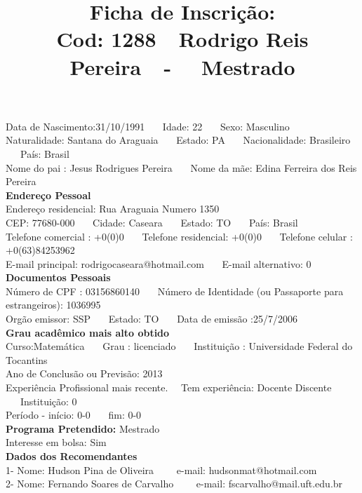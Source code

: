 \documentclass[11pt]{article}
\title{\vspace*{-4cm} Ficha de Inscrição: \\Cod: 1288\ \ Rodrigo Reis Pereira\ \ - \ \ Mestrado 
 }
\date{}
\begin{document}
\maketitle
\vspace*{-1.5cm}
\noindent Data de Nascimento:31/10/1991
\ \ \ Idade: 22   \ \ \ Sexo: Masculino
\\
Naturalidade: Santana do Araguaia  
\ \ \  Estado: PA
\ \ \  Nacionalidade: Brasileiro
\ \ \ País: Brasil
\\        
Nome do pai : Jesus Rodrigues Pereira
\ \ \ Nome da mãe: Edina Ferreira dos Reis Pereira          
\\[0.2cm]                     
\textbf{Endereço Pessoal} 
\\ 
\noindent Endereço residencial: Rua Araguaia Numero 1350
\\
        CEP: 77680-000 
\ \ \ Cidade: Caseara 
\ \ \ Estado: TO 
\ \ \ País: Brasil
\\		
		Telefone comercial : +0(0)0
\ \ \ Telefone residencial: +0(0)0
\ \ \ Telefone celular : +0(63)84253962
\\
E-mail principal: rodrigocaseara@hotmail.com
\ \ \ E-mail alternativo: 0 
\\[0.2cm] 
\textbf{Documentos Pessoais}
\\
\noindent Número de CPF : 03156860140
\ \ \ Número de Identidade (ou Passaporte para estrangeiros): 1036995
\\
Orgão emissor: SSP
\ \ \ Estado: TO
\ \ \ Data de emissão :25/7/2006
\\[0.3cm]
\textbf{Grau acadêmico mais alto obtido}
\\	
Curso:Matemática
\ \ \ Grau : licenciado
\ \ \ Instituição : Universidade Federal do Tocantins
\\			
Ano de Conclusão ou Previsão: 2013
\\ 
Experiência Profissional mais recente. \ \  
Tem experiência: Docente Discente  
\ \ \ Instituição: 0
\\  
Período - início: 0-0
\ \ \ fim: 0-0
\\[0.2cm] 
\textbf{Programa Pretendido:} Mestrado\\
Interesse em bolsa: Sim
\\[0.3cm]		
\textbf{Dados dos Recomendantes} 
\\
1- Nome: Hudson Pina de Oliveira
\ \ \ \  e-mail: hudsonmat@hotmail.com 
\\
2- Nome: Fernando Soares de Carvalho
\ \ \ \ e-mail: fscarvalho@mail.uft.edu.br
\\
\end{document}
